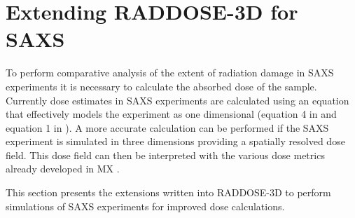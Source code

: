 \section{Extending RADDOSE-3D for SAXS}
\label{sec:Extending RADDOSE-3D for SAXS}
To perform comparative analysis of the extent of radiation damage in SAXS experiments it is necessary to calculate the absorbed dose of the sample.
Currently dose estimates in SAXS experiments are calculated using an equation that effectively models the experiment as one dimensional (equation 4 in \cite{meisburger2013breaking} and equation 1 in \cite{jeffries2015limiting}).
A more accurate calculation can be performed if the SAXS experiment is simulated in three dimensions providing a spatially resolved dose field.
This dose field can then be interpreted with the various dose metrics already developed in MX \cite{zeldin2013dwd,zeldin2012}.

This section presents the extensions written into RADDOSE-3D to perform simulations of SAXS experiments for improved dose calculations.

